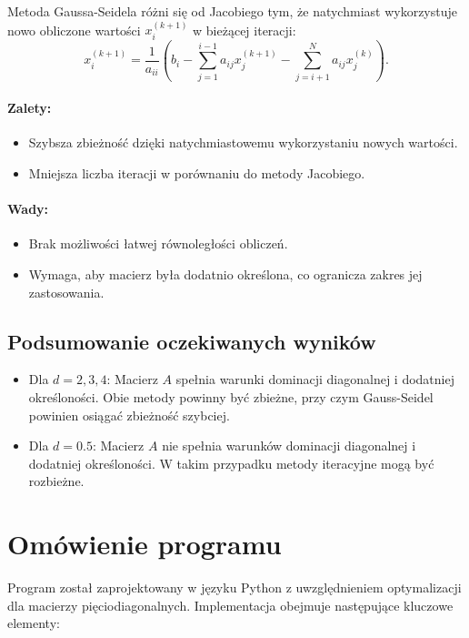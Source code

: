 \documentclass[a4paper,12pt]{article}
\begin{document}
Metoda Gaussa-Seidela różni się od Jacobiego tym, że natychmiast wykorzystuje nowo obliczone wartości \(x_i^{(k+1)}\) w bieżącej iteracji:
\[
x_i^{(k+1)} = \frac{1}{a_{ii}} \left( b_i - \sum_{j=1}^{i-1} a_{ij} x_j^{(k+1)} - \sum_{j=i+1}^N a_{ij} x_j^{(k)} \right).
\]

\paragraph{Zalety:}
\begin{itemize}
    \item Szybsza zbieżność dzięki natychmiastowemu wykorzystaniu nowych wartości.
    \item Mniejsza liczba iteracji w porównaniu do metody Jacobiego.
\end{itemize}

\paragraph{Wady:}
\begin{itemize}
    \item Brak możliwości łatwej równoległości obliczeń.
    \item Wymaga, aby macierz była dodatnio określona, co ogranicza zakres jej zastosowania.
\end{itemize}

\subsection{Podsumowanie oczekiwanych wyników}

\begin{itemize}
    \item Dla \(d = 2, 3, 4\): Macierz \(A\) spełnia warunki dominacji diagonalnej i dodatniej określoności. Obie metody powinny być zbieżne, przy czym Gauss-Seidel powinien osiągać zbieżność szybciej.
    \item Dla \(d = 0.5\): Macierz \(A\) nie spełnia warunków dominacji diagonalnej i dodatniej określoności. W takim przypadku metody iteracyjne mogą być rozbieżne.
\end{itemize}

\section{Omówienie programu}

Program został zaprojektowany w języku Python z uwzględnieniem optymalizacji dla macierzy pięciodiagonalnych. Implementacja obejmuje następujące kluczowe elementy:
\end{document}
